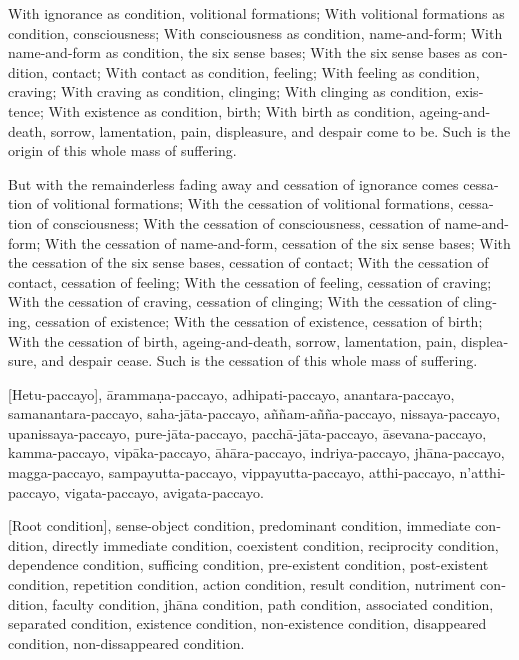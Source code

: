 \begin{english}
  With ignorance as condition, volitional formations;
  With volitional formations as condition, consciousness;
  With consciousness as condition, name-and-form;
  With name-and-form as condition, the six sense bases;
  With the six sense bases as condition, contact;
  With contact as condition, feeling;
  With feeling as condition, craving;
  With craving as condition, clinging;
  With clinging as condition, existence;
  With existence as condition, birth;
  With birth as condition, ageing-and-death, sorrow, lamentation, pain, displeasure, and despair come to be.
  Such is the origin of this whole mass of suffering.

  But with the remainderless fading away and cessation of ignorance comes cessation of volitional formations;
  With the cessation of volitional formations, cessation of consciousness;
  With the cessation of consciousness, cessation of name-and-form;
  With the cessation of name-and-form, cessation of the six sense bases;
  With the cessation of the six sense bases, cessation of contact;
  With the cessation of contact, cessation of feeling;
  With the cessation of feeling, cessation of craving;
  With the cessation of craving, cessation of clinging;
  With the cessation of clinging, cessation of existence;
  With the cessation of existence, cessation of birth;
  With the cessation of birth, ageing-and-death, sorrow, lamentation, pain, displeasure, and despair cease.
  Such is the cessation of this whole mass of suffering.
\end{english}

\suttaRef{[SN 12.1]}

[Hetu-paccayo], ārammaṇa-paccayo,
adhipati-paccayo, anantara-paccayo,
samanantara-paccayo, saha-jāta-paccayo,
aññam-añña-paccayo, nissaya-paccayo,
upanissaya-paccayo, pure-jāta-paccayo,
pacchā-jāta-paccayo, āsevana-paccayo,
kamma-paccayo, vipāka-paccayo,
āhāra-paccayo, indriya-paccayo,
jhāna-paccayo, magga-paccayo,
sampayutta-paccayo, vippayutta-paccayo,
atthi-paccayo, n’atthi-paccayo,
vigata-paccayo, avigata-paccayo.

\begin{english}
  [Root condition], sense-object condition,
  predominant condition, immediate condition,
  directly immediate condition, coexistent condition,
  reciprocity condition, dependence condition,
  sufficing condition, pre-existent condition,
  post-existent condition, repetition condition,
  action condition, result condition,
  nutriment condition, faculty condition,
  jhāna condition, path condition,
  associated condition, separated condition,
  existence condition, non-existence condition,
  disappeared condition, non-dissappeared condition.
\end{english}

